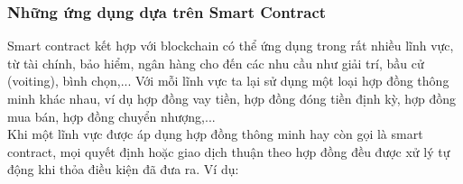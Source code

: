 \subsubsection{Những ứng dụng dựa trên Smart Contract}

Smart contract kết hợp với blockchain có thể ứng dụng trong rất nhiều lĩnh vực, từ tài chính, bảo hiểm, ngân hàng cho đến các nhu cầu như giải trí, bầu cử (voiting), bình chọn,... Với mỗi lĩnh vực ta lại sử dụng một loại hợp đồng thông minh khác nhau, ví dụ hợp đồng vay tiền, hợp đồng đóng tiền định kỳ, hợp đồng mua bán, hợp đồng chuyển nhượng,...\\

Khi một lĩnh vực được áp dụng hợp đồng thông minh hay còn gọi là smart contract, mọi quyết định hoặc giao dịch thuận theo hợp đồng đều được xử lý tự động khi thỏa điều kiện đã đưa ra. Ví dụ:


